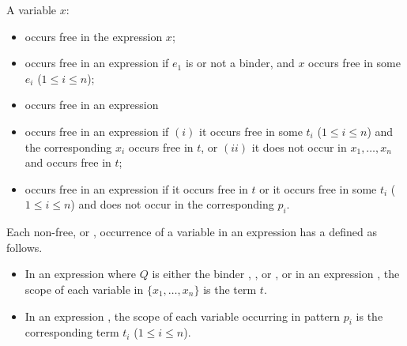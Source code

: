 \noindent A variable $x$:
\begin{itemize}
\item
occurs free in the expression $x$;
\item
occurs free in an expression 
if $e_1$ is  or not a binder, and 
$x$ occurs free in some $e_i$ ($1\le i\le n$); 
\item
occurs free in an expression 
\item
occurs free in an expression 
 if 
$(i)$ it occurs free in some $t_i$ ($1\le i\le n$) and 
the corresponding $x_i$ occurs free in $t$, or 
$(ii)$ it does not occur in $x_1, \ldots, x_n$ and occurs free in $t$;
\item
occurs free in an expression
if it occurs free in $t$ or it occurs free in some $t_i$ ($1\le i\le n$) and
does not occur in the corresponding $p_i$.
\end{itemize}


\noindent 
Each non-free, or , occurrence of a variable 
in an expression has a  defined as follows.

\begin{itemize}
\item
In an expression 
where $Q$ is either the binder , , or , 
or in an expression ,
the scope of each variable in $\{x_1, \ldots, x_n\}$ is the term $t$.
\item
In an expression 
,
the scope of each variable occurring in pattern $p_i$ is the corresponding term $t_i$
($1\le i\le n$).
\end{itemize}

